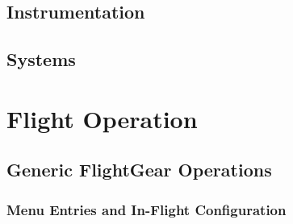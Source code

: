 \documentclass[a4paper]{report}
\newcommand{\AJSonly}[1]{\ifbool{AJS}{#1}{}}
\begin{document}
\chapter{Instrumentation}
\chapter{Systems}



\part{Flight Operation}
\chapter{Generic FlightGear Operations}
\section{Menu Entries and In-Flight Configuration}
\end{document}
